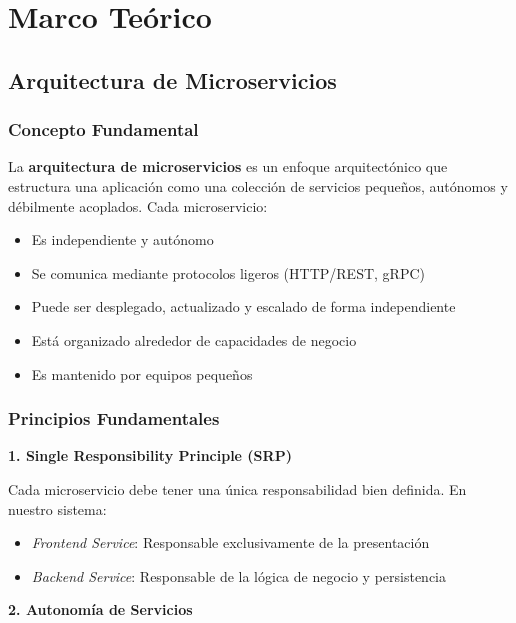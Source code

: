 \documentclass[12pt,a4paper]{article}
\begin{document}
\newpage

\section{Marco Teórico}

\subsection{Arquitectura de Microservicios}

\subsubsection{Concepto Fundamental}

La \textbf{arquitectura de microservicios} es un enfoque arquitectónico que estructura una aplicación como una colección de servicios pequeños, autónomos y débilmente acoplados. Cada microservicio:

\begin{itemize}[leftmargin=*]
    \item Es independiente y autónomo
    \item Se comunica mediante protocolos ligeros (HTTP/REST, gRPC)
    \item Puede ser desplegado, actualizado y escalado de forma independiente
    \item Está organizado alrededor de capacidades de negocio
    \item Es mantenido por equipos pequeños
\end{itemize}

\subsubsection{Principios Fundamentales}

\textbf{1. Single Responsibility Principle (SRP)}

Cada microservicio debe tener una única responsabilidad bien definida. En nuestro sistema:
\begin{itemize}
    \item \textit{Frontend Service}: Responsable exclusivamente de la presentación
    \item \textit{Backend Service}: Responsable de la lógica de negocio y persistencia
\end{itemize}

\textbf{2. Autonomía de Servicios}
\end{document}
